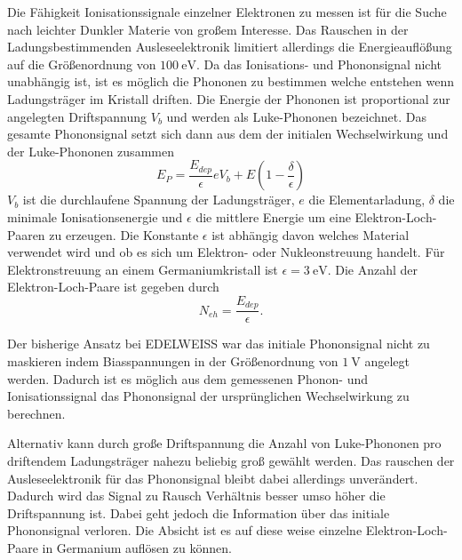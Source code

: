 Die Fähigkeit Ionisationssignale einzelner Elektronen zu messen ist für die Suche nach leichter Dunkler Materie von großem Interesse.
Das Rauschen in der Ladungsbestimmenden Ausleseelektronik limitiert allerdings die Energieauflößung auf die Größenordnung von $\SI{100}{\electronvolt}$.
Da das Ionisations- und Phononsignal nicht unabhängig ist, ist es möglich die Phononen zu bestimmen welche entstehen wenn Ladungsträger im Kristall driften.
Die Energie der Phononen ist proportional zur angelegten Driftspannung $V_b$ und werden als Luke-Phononen bezeichnet.
Das gesamte Phononsignal setzt sich dann aus dem der initialen Wechselwirkung und der Luke-Phononen zusammen
\begin{equation}
E_P = \frac{E_{dep}}{\epsilon}eV_b + E(1-\frac{\delta}{\epsilon})
\end{equation}
$V_b$ ist die durchlaufene Spannung der Ladungsträger, $e$ die Elementarladung, $\delta$ die minimale Ionisationsenergie und $\epsilon$ die mittlere Energie um eine Elektron-Loch-Paaren zu erzeugen.
Die Konstante $\epsilon$ ist abhängig davon welches Material verwendet wird und ob es sich um Elektron- oder Nukleonstreuung handelt.
Für Elektronstreuung an einem Germaniumkristall ist $\epsilon=\SI{3}{\electronvolt}$\cite{Luke1988}.
Die Anzahl der Elektron-Loch-Paare ist gegeben durch
\begin{equation}
N_{eh} = \frac{E_{dep}}{\epsilon}.
\end{equation}

Der bisherige Ansatz bei EDELWEISS war das initiale Phononsignal nicht zu maskieren indem Biasspannungen in der Größenordnung von $\SI{1}{\volt}$\cite{Arnaud2016} angelegt werden.
Dadurch ist es möglich aus dem gemessenen Phonon- und Ionisationssignal das Phononsignal der ursprünglichen Wechselwirkung zu berechnen.

Alternativ kann durch große Driftspannung die Anzahl von Luke-Phononen pro driftendem Ladungsträger nahezu beliebig groß gewählt werden.
Das rauschen der Ausleseelektronik für das Phononsignal bleibt dabei allerdings unverändert.
Dadurch wird das Signal zu Rausch Verhältnis besser umso höher die Driftspannung ist.
Dabei geht jedoch die Information über das initiale Phononsignal verloren.
Die Absicht ist es auf diese weise einzelne Elektron-Loch-Paare in Germanium auflösen zu können\cite{Mirabolfathi2015}.
